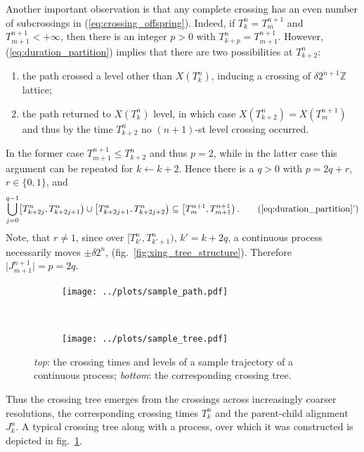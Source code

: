 \documentclass[a4paper]{article}
\begin{document}
Another important observation is that any complete crossing has an even number of
subcrossings in (\ref{eq:crossing_offspring}). Indeed, if $T_k^n = T_m^{n+1}$ and
$T_{m+1}^{n+1} < +\infty$, then there is an integer $p > 0$ with $T_{k+p}^n = T_{m+1}^{n+1}$.
However, (\ref{eq:duration_partition}) implies that there are two possibilities at
$T_{k+2}^n$:
\begin{enumerate}
    \item the path crossed a level other than $X(T_k^n)$, inducing a crossing of
    $\delta 2^{n+1}\mathbb{Z}$ lattice;
    \item the path returned to $X(T_k^n)$ level, in which case $X(T_{k+2}^n) = X(T_m^{n+1})$
    and thus by the time $T_{k+2}^n$ no $(n+1)$-st level crossing occurred.
\end{enumerate}
In the former case $T_{m+1}^{n+1} \leq T_{k+2}^n$ and thus $p=2$, while in the latter
case this argument can be repeated for $k \leftarrow k+2$. Hence there is a $q > 0$
with $p = 2q + r$, $r \in \{0, 1\}$, and
\begin{equation*} \label{eq:subcrossing_partition}
    \bigcup_{j=0}^{q-1} \bigl[T_{k+2j}^n, T_{k+2j+1}^n\bigr)
                   \cup \bigl[T_{k+2j+1}^n, T_{k+2j+2}^n\bigr)
        \subseteq \bigl[T_m^{n+1}, T_{m+1}^{n+1}\bigr) \,.
        \tag{\ref{eq:duration_partition}'}
\end{equation*}
Note, that $r\neq 1$, since over $\bigl[T_{k'}^n, T_{k'+1}^n\bigr)$, $k' = k + 2q$,
a continuous process necessarily moves $\pm \delta 2^n$, (fig.~\ref{fig:xing_tree_structure}).
Therefore $\bigl| J_{m+1}^{n+1} \bigr| = p = 2q$.

\begin{figure}[ht]
    \centering
    \begin{subfigure}{\linewidth}
        \texttt{[image: ../plots/sample\_path.pdf]}
    \end{subfigure}\\
    \vspace{-20pt}
    \begin{subfigure}{\linewidth}
        \texttt{[image: ../plots/sample\_tree.pdf]}
    \end{subfigure}
    \vspace{-10pt}
    \caption{\emph{top}: the crossing times and levels of a sample trajectory of
    a continuous process; \emph{bottom}: the corresponding crossing tree.}
    \label{fig:sample_tree}
\end{figure}

Thus the crossing tree emerges from the crossings across increasingly coarser resolutions,
the corresponding crossing times $T_k^n$ and the parent-child alignment $J_k^n$. A
typical crossing tree along with a process, over which it was constructed is depicted
in fig.~\ref{fig:sample_tree}.
\end{document}
